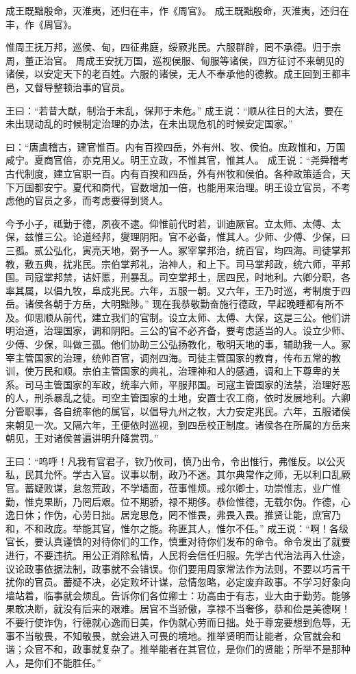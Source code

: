 \documentclass[12pt,UTF8]{ctexbook}
\begin{document}
成王既黜殷命，灭淮夷，还归在丰，作《周官》。
成王既黜殷命，灭淮夷，还归在丰，作《周官》。

惟周王抚万邦，巡侯、甸，四征弗庭，绥厥兆民。六服群辟，罔不承德。归于宗周，董正治官。
周成王安抚万国，巡视侯服、甸服等诸侯，四方征讨不来朝见的诸侯，以安定天下的老百姓。六服的诸侯，无人不奉承他的德教。成王回到王都丰邑，又督导整顿治事的官员。

王曰：“若昔大猷，制治于未乱，保邦于未危。”
成王说：“顺从往日的大法，要在未出现动乱的时候制定治理的办法，在未出现危机的时候安定国家。”

曰：“唐虞稽古，建官惟百。内有百揆四岳，外有州、牧、侯伯。庶政惟和，万国咸宁。夏商官倍，亦克用乂。明王立政，不惟其官，惟其人。
成王说：“尧舜稽考古代制度，建立官职一百。内有百揆和四岳，外有州牧和侯伯。各种政策适合，天下万国都安宁。夏代和商代，官数增加一倍，也能用来治理。明王设立官员，不考虑他的官员之多，而考虑要得到贤人。

今予小子，祗勤于德，夙夜不逮。仰惟前代时若，训迪厥官。立太师、太傅、太保，兹惟三公。论道经邦，燮理阴阳。官不必备，惟其人。少师、少傅、少保，曰三孤。贰公弘化，寅亮天地，弼予一人。冢宰掌邦治，统百官，均四海。司徒掌邦教，敷五典，扰兆民。宗伯掌邦礼，治神人，和上下。司马掌邦政，统六师，平邦国。司寇掌邦禁，诘奸慝，刑暴乱。司空掌邦土，居四民，时地利。六卿分职，各率其属，以倡九牧，阜成兆民。六年，五服一朝。又六年，王乃时巡，考制度于四岳。诸侯各朝于方岳，大明黜陟。”
现在我恭敬勤奋施行德政，早起晚睡都有所不及。仰思顺从前代，建立我们的官制。设立太师、太傅、大保，这是三公。他们讲明治道，治理国家，调和阴阳。三公的官不必齐备，要考虑适当的人。设立少师、少傅、少保，叫做三孤。他们协助三公弘扬教化，敬明天地的事，辅助我一人。冢宰主管国家的治理，统帅百官，调剂四海。司徒主管国家的教育，传布五常的教训，使万民和顺。宗伯主管国家的典礼，治理神和人的感通，调和上下尊卑的关系。司马主管国家的军政，统率六师，平服邦国。司寇主管国家的法禁，治理好恶的人，刑杀暴乱之徒。司空主管国家的土地，安置士农工商，依时发展地利。六卿分管职事，各自统率他的属官，以倡导九州之牧，大力安定兆民。六年，五服诸侯来朝见一次。又隔六年，王便依时巡视，到四岳校正制度。诸侯各在所属的方岳来朝见，王对诸侯普遍讲明升降赏罚。”

王曰：“呜呼！凡我有官君子，钦乃攸司，慎乃出令，令出惟行，弗惟反。以公灭私，民其允怀。学古入官。议事以制，政乃不迷。其尔典常作之师，无以利口乱厥官。蓄疑败谋，怠忽荒政，不学墙面，莅事惟烦。戒尔卿士，功崇惟志，业广惟勤，惟克果断，乃罔后艰。位不期骄，禄不期侈。恭俭惟德，无载尔伪。作德，心逸日休；作伪，心劳日拙。居宠思危，罔不惟畏，弗畏入畏。推贤让能，庶官乃和，不和政庞。举能其官，惟尔之能。称匪其人，惟尔不任。”
成王说：“啊！各级官长，要认真谨慎的对待你们的工作，慎重对待你们发布的命令。命令发出了就要进行，不要违抗。用公正消除私情，人民将会信任归服。先学古代治法再入仕途，议论政事依据法制，政事就不会错误。你们要用周家常法作为法则，不要以巧言干扰你的官员。蓄疑不决，必定败坏计谋，怠情忽略，必定废弃政事。不学习好象向墙站着，临事就会烦乱。告诉你们各位卿士：功高由于有志，业大由于勤劳。能够果敢决断，就没有后来的艰难。居官不当骄傲，享禄不当奢侈，恭和俭是美德啊！不要行使诈伪，行德就心逸而日美，作伪就心劳而日拙。处于尊宠要想到危辱，无事不当敬畏，不知敬畏，就会进入可畏的境地。推举贤明而让能者，众官就会和谐；众官不和，政事就复杂了。推举能者在其官位，是你们的贤能；所举不是那种人，是你们不能胜任。”
\end{document}
